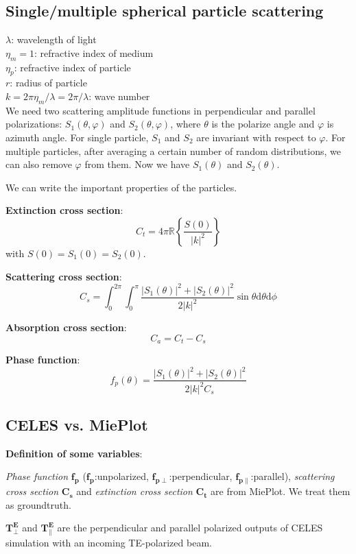 \subsection{Single/multiple spherical particle scattering }

$\lambda$: wavelength of light \\
$\eta_m=1$: refractive index of medium \\
$\eta_p$: refractive index of particle \\
$r$: radius of particle \\
$k=2\pi\eta_m/\lambda=2\pi/\lambda$: wave number \\ 

We need two scattering amplitude functions in perpendicular and parallel polarizations:
$S_1(\theta, \varphi)$ and $S_2(\theta, \varphi)$,
where $\theta$ is the polarize angle and $\varphi$ is azimuth angle.
For single particle, $S_1$ and $S_2$ are invariant with respect to $\varphi$.
For multiple particles, after averaging a certain number of random distributions, we can also remove $\varphi$ from them. Now we have $S_1(\theta)$ and $S_2(\theta)$.


We can write the important properties of the particles.

\textbf{Extinction cross section}:
$$C_t = 4\pi\mathbb{R}\left\{\frac{S(0)}{|k|^2}\right\}$$
with $S(0)=S_1(0)=S_2(0)$.

\textbf{Scattering cross section}:
$$C_s = \int_0^{2\pi}\int_0^\pi \frac{|S_1(\theta)|^2+|S_2(\theta)|^2}{2|k|^2} \sin\theta\mathrm{d}\theta\mathrm{d}\phi$$

\textbf{Absorption cross section}:
$$C_a = C_t - C_s$$

\textbf{Phase function}:
$$f_p(\theta) = \frac{|S_1(\theta)|^2+|S_2(\theta)|^2}{2|k|^2C_s}$$

\subsection{CELES vs. MiePlot}
\textbf{Definition of some variables}:

\textit{Phase function} $\mathbf{f_p}$ ($\mathbf{f_p}$:unpolarized, $\mathbf{f_{p\perp}}$:perpendicular, $\mathbf{f_{p\parallel}}$:parallel), \textit{scattering cross section} $\mathbf{C_s}$ and \textit{extinction cross section} $\mathbf{C_t}$ are from MiePlot. We treat them as groundtruth.

$\mathbf{T_\perp^E}$ and $\mathbf{T_\parallel^E}$ are the perpendicular and parallel polarized outputs of CELES simulation with an incoming TE-polarized beam.

